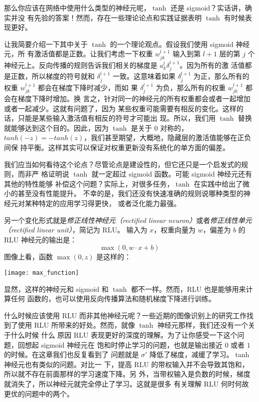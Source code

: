 那么你应该在网络中使用什么类型的神经元呢，$\tanh$ 还是 sigmoid？实话讲，确实并没
有先验的答案！然而，存在一些理论论点和实践证据表明 $\tanh$ 有时候表现更好。

让我简要介绍一下其中关于 $\tanh$ 的一个理论观点。假设我们使用 sigmoid 神经元，所
有激活值都是正数。让我们考虑一下权重 $w_{jk}^{l+1}$ 输入到第 $l+1$ 层的第 $j$ 个
神经元上。反向传播的规则告诉我们相关的梯度是 $a_k^l\delta_j^{l+1}$。因为所有的激
活值都是正数，所以梯度的符号就和 $\delta_j^{l+1}$ 一致。这意味着如果
$\delta_j^{l+1}$ 为正，那么所有的权重 $w_{jk}^{l+1}$ 都会在梯度下降时减少，而如
果 $\delta_j^{l+1}$ 为负，那么所有的权重 $w_{jk}^{l+1}$ 都会在梯度下降时增加。换
言之，针对同一的神经元的所有权重都会或者一起增加或者一起减少。这就有问题了，因为
某些权重可能需要有相反的变化。这样的话，只能是某些输入激活值有相反的符号才可能出
现。所以，我们用 $\tanh$ 替换就能够达到这个目的。因此，因为 $\tanh$ 是关于 $0$
对称的，$tanh(-z)=-tanh(z)$，我们甚至期望，大概地，隐藏层的激活值能够在正负间保
持平衡。这样其实可以保证对权重更新没有系统化的单方面的偏差。

我们应当如何看待这个论点？尽管论点是建设性的，但它还只是一个启发式的规则，而非严
格证明说 $\tanh$ 就一定超过 sigmoid 函数。可能 sigmoid 神经元还有其他的特性能够
补偿这个问题？实际上，对很多任务，$\tanh$ 在实践中给出了微小的甚至没有性能提升。
不幸的是，我们还没有快速准确的规则说哪种类型的神经元对某种特定的应用学习得更快，
或者泛化能力最强。

另一个变化形式就是\emph{修正线性神经元（rectified linear
    neuron）}或者\emph{修正线性单元（rectified linear unit）}，简记为 RLU。
输入为 $x$，权重向量为 $w$，偏差为 $b$ 的 RLU 神经元的输出是：
\begin{equation}
  \max(0, w \cdot x+b)
  \label{eq:112}\tag{112}
\end{equation}
图像上看，函数 $\max(0,z)$ 是这样的：
\begin{center}
  \texttt{[image: max\_function]}
\end{center}

显然，这样的神经元和 sigmoid 和 $\tanh$ 都不一样。然而，RLU 也是能够用来计算任何
函数的，也可以使用反向传播算法和随机梯度下降进行训练。

什么时候应该使用 RLU 而非其他神经元呢？一些近期的图像识别上的研究工作找到了使用
RLU 所带来的好处。然而，就像 $\tanh$ 神经元那样，我们还没有一个关于什么时候 什么
原因 RLU 表现更好的深度的理解。为了让你感受一下这个问题，回想起 sigmoid 神经元在
饱和时停止学习的问题，也就是输出接近 $0$ 或者 $1$ 的时候。在这章我们也反复看到了
问题就是 $\sigma'$ 降低了梯度，减缓了学习。$\tanh$ 神经元也有类似的问题。对比一
下，提高 RLU 的带权输入并不会导致其饱和，所以就不存在前面那样的学习速度下降。另
外，当带权输入是负数的时候，梯度就消失了，所以神经元就完全停止了学习。这就是很多
有关理解 RLU 何时何故更优的问题中的两个。

